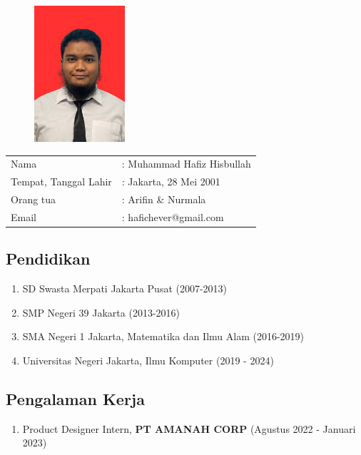 \chapter*{}

\begin{figure}[H]
\centering
\includegraphics[width=0.3\textwidth]{gambar/hafiz_red.jpg}
\end{figure}

\noindent
\begin{tabular}{ll}
Nama & : Muhammad Hafiz Hisbullah \\
Tempat, Tanggal Lahir & : Jakarta, 28 Mei 2001 \\
Orang tua & : Arifin \& Nurmala \\
Email & : hafichever@gmail.com
\end{tabular}

\section*{Pendidikan}
\begin{enumerate}
    \itemsep0em 
    \item SD Swasta Merpati Jakarta Pusat (2007-2013)
    \item SMP Negeri 39 Jakarta (2013-2016)
    \item SMA Negeri 1 Jakarta, Matematika dan Ilmu Alam (2016-2019)
    \item Universitas Negeri Jakarta, Ilmu Komputer (2019 - 2024)
\end{enumerate}

\section*{Pengalaman Kerja}
\begin{enumerate}
    \itemsep0em 
    \item Product Designer Intern, \textbf{PT AMANAH CORP} (Agustus 2022 - Januari 2023)
\end{enumerate}
